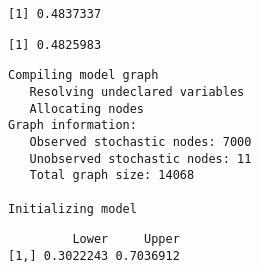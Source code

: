 \documentclass[12pt,twoside]{dukestatscithesis}
\theoremstyle{definition}
\theoremstyle{definition}
\theoremstyle{definition}
\theoremstyle{remark}
\begin{document}
\begin{verbatim}
[1] 0.4837337
\end{verbatim}
\begin{Shaded}
\begin{Highlighting}[]
\OperatorTok{$}\OperatorTok{$}\OperatorTok{$}
\end{Highlighting}
\end{Shaded}
\begin{verbatim}
[1] 0.4825983
\end{verbatim}
\begin{Shaded}
\begin{Highlighting}[]
\StringTok{ }\NormalTok{(}
                    \NormalTok{, }\NormalTok{(}\NormalTok{, }\NormalTok{, }\NormalTok{,}\NormalTok{),}
\end{Highlighting}
\end{Shaded}
\begin{verbatim}
Compiling model graph
   Resolving undeclared variables
   Allocating nodes
Graph information:
   Observed stochastic nodes: 7000
   Unobserved stochastic nodes: 11
   Total graph size: 14068

Initializing model
\end{verbatim}
\begin{Shaded}
\begin{Highlighting}[]
\OperatorTok{$}\OperatorTok{$}\OperatorTok{$}
\end{Highlighting}
\end{Shaded}
\begin{verbatim}
         Lower     Upper
[1,] 0.3022243 0.7036912
\end{verbatim}
\begin{Shaded}
\begin{Highlighting}[]
\OperatorTok{$}\OperatorTok{$}\OperatorTok{$}
\end{Highlighting}
\end{Shaded}
\end{document}
